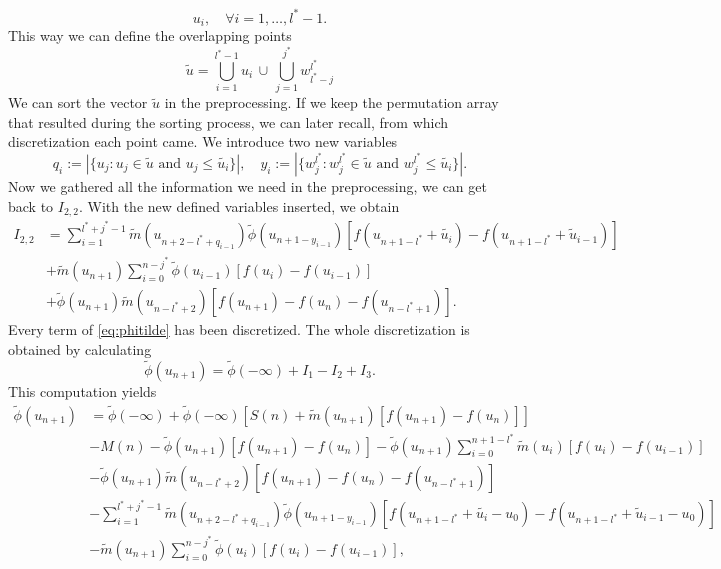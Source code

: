 \documentclass[12pt,a4paper,twoside, open=right]{scrreprt}
\theoremstyle{definition}
\theoremstyle{plain}
\newcommand{\abs}[1]{\left\vert #1\right\vert}
\begin{document}
\begin{equation}
    u_i,\quad\forall i=1,\dotsc,l^*-1.
\end{equation}
This way we can define the overlapping points 
\begin{equation}
    \tilde{u}= \bigcup_{i=1}^{l^*-1}u_i\,\cup\,\bigcup_{j=1}^{j^*}w^{l^*}_{l^*-j}
\end{equation}
We can sort the vector $\tilde{u}$ in the preprocessing. If we keep the permutation array that resulted during the sorting process, we can later recall, from which discretization each point came. We introduce two new variables
\begin{equation}
    q_i:=\abs{\{u_j\colon u_j\in\tilde{u} \text{ and }u_j\le\tilde{u_i} \}},\quad
    y_i:=\abs{\{w^{l^*}_j\colon w^{l^*}_j\in\tilde{u} \text{ and }w^{l^*}_j\le\tilde{u_i} \}}.
\end{equation}
Now we gathered all the information we need in the preprocessing, we can get back to $I_{2,2}$. With the new defined variables inserted, we obtain
\begin{align}
    I_{2,2}&= \sum_{i=1}^{l^*+j^*-1}\tilde{m}(u_{n+2-l^*+q_{i-1}})\tilde{\phi}(u_{n+1-y_{i-1}})[f(u_{n+1-l^*}+\tilde{u_i})-f(u_{n+1-l^*}+\tilde{u}_{i-1})]\\&+\tilde{m}(u_{n+1})\sum_{i=0}^{n-j^*}\tilde\phi(u_{i-1})[f(u_i)-f(u_{i-1})] \\&+ \tilde\phi(u_{n+1})\tilde{m}(u_{n-l^*+2})[f(u_{n+1})-f(u_n)-f(u_{n-l^*+1})].
\end{align}
Every term of \eqref{eq:phitilde} has been discretized. The whole discretization is obtained by calculating
\begin{equation}
    \tilde\phi(u_{n+1})=\tilde\phi(-\infty) + I_1 -I_2 +I_3.
\end{equation}
This computation yields
\begin{align}
    \tilde\phi(u_{n+1})&=\tilde\phi(-\infty) +\tilde\phi(-\infty)[S(n)+\tilde{m}(u_{n+1})[f(u_{n+1})-f(u_n)]]\label{eq:discphit1}\\&-M(n)\label{eq:discphit2} -\tilde\phi(u_{n+1})[f(u_{n+1})-f(u_{n})]  -\tilde{\phi}(u_{n+1})\sum_{i=0}^{n+1-l^*}\tilde{m}(u_i)[f(u_i)-f(u_{i-1})]\\&- \tilde\phi(u_{n+1})\tilde{m}(u_{n-l^*+2})[f(u_{n+1})-f(u_n)-f(u_{n-l^*+1})] \\&\label{eq:discphit3}-\sum_{i=1}^{l^*+j^*-1}\tilde{m}(u_{n+2-l^*+q_{i-1}})\tilde{\phi}(u_{n+1-y_{i-1}})[f(u_{n+1-l^*}+\tilde{u_i}-u_0)-f(u_{n+1-l^*}+\tilde{u}_{i-1}-u_0)]\\&\label{eq:discphit4}-\tilde{m}(u_{n+1})\sum_{i=0}^{n-j^*}\tilde\phi(u_{i})[f(u_i)-f(u_{i-1})],
\end{align}
\end{document}

